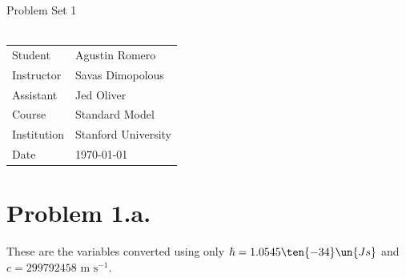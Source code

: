 \documentclass{article}
\begin{document}
\begin{center}
{\Large{Problem Set 1}}\\~\\
\begin{tabular}{l l}
Student&Agustin Romero\\
Instructor&Savas Dimopolous\\
Assistant&Jed Oliver\\
Course&Standard Model\\    
Institution&Stanford University\\
Date&\today\\
\end{tabular}
\end{center}
\section*{Problem 1.a.}
These are the variables converted using only $\hbar=1.0545\ten{-34}\un{ Js}$ and $c=299792458\textrm{ m}\textrm{ s}^{-1}$.
\end{document}

